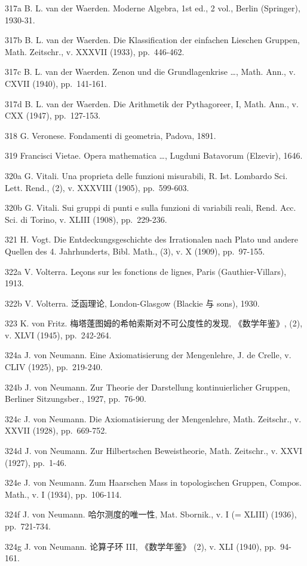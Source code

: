 317a B. L. van der Waerden. Moderne Algebra, 1st ed., 2 vol., Berlin (Springer), 1930-31.

317b B. L. van der Waerden. Die Klassification der einfachen Lieschen Gruppen, Math. Zeitschr., v. XXXVII (1933), pp.~446-462.

317c B. L. van der Waerden. Zenon und die Grundlagenkrise \ldots, Math. Ann., v. CXVII (1940), pp.~141-161.

317d B. L. van der Waerden. Die Arithmetik der Pythagoreer, I, Math. Ann., v. CXX (1947), pp.~127-153.

318 G. Veronese. Fondamenti di geometria, Padova, 1891.

319 Francisci Vietae. Opera mathematica \ldots, Lugduni Batavorum (Elzevir), 1646.

320a G. Vitali. Una proprieta delle funzioni misurabili, R. Ist. Lombardo Sci. Lett. Rend., (2), v. XXXVIII (1905), pp.~599-603.

320b G. Vitali. Sui gruppi di punti e sulla funzioni di variabili reali, Rend. Acc. Sci. di Torino, v. XLIII (1908), pp.~229-236.

321 H. Vogt. Die Entdeckungsgeschichte des Irrationalen nach Plato und andere Quellen des 4. Jahrhunderts, Bibl. Math., (3), v. X (1909), pp.~97-155.

322a V. Volterra. Leçons sur les fonctions de lignes, Paris (Gauthier-Villars), 1913.

322b V. Volterra. 泛函理论, London-Glasgow (Blackie 与 sons), 1930.

323 K. von Fritz. 梅塔蓬图姆的希帕索斯对不可公度性的发现, 《数学年鉴》, (2), v. XLVI (1945), pp.~242-264.

324a J. von Neumann. Eine Axiomatisierung der Mengenlehre, J. de Crelle, v. CLIV (1925), pp.~219-240.

324b J. von Neumann. Zur Theorie der Darstellung kontinuierlicher Gruppen, Berliner Sitzungsber., 1927, pp.~76-90.

324c J. von Neumann. Die Axiomatisierung der Mengenlehre, Math. Zeitschr., v. XXVII (1928), pp.~669-752.

324d J. von Neumann. Zur Hilbertschen Beweistheorie, Math. Zeitschr., v. XXVI (1927), pp.~1-46.

324e J. von Neumann. Zum Haarschen Mass in topologischen Gruppen, Compos. Math., v. I (1934), pp.~106-114.

324f J. von Neumann. 哈尔测度的唯一性, Mat. Sbornik., v. I (= XLIII) (1936), pp.~721-734.

324g J. von Neumann. 论算子环 III, 《数学年鉴》 (2), v. XLI (1940), pp.~94-161.

